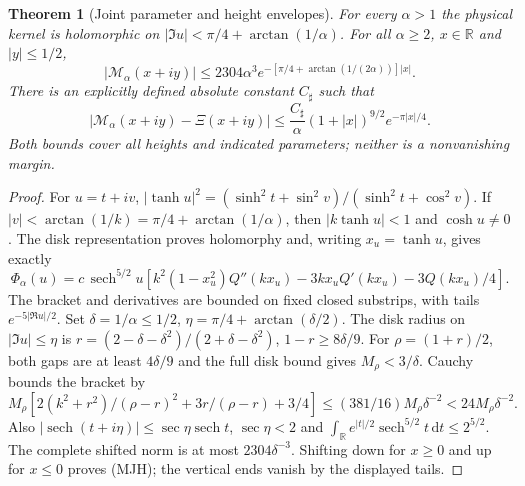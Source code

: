 \documentclass[11pt]{article}
\newtheorem{theorem}{Theorem}
\theoremstyle{remark}\newtheorem{remark}[theorem]{Remark}
\newcommand{\R}{\mathbb R}
\newcommand{\dd}{\,\mathrm d}
\begin{document}
\begin{theorem}[Joint parameter and height envelopes]
\label{thm:mehler-joint-envelope}
For every $\alpha>1$ the physical kernel is holomorphic on
$|\Im u|<\pi/4+\arctan(1/\alpha)$.
For all $\alpha\ge2$, $x\in\R$ and $|y|\le1/2$,
\[
 |\mathcal M_\alpha(x+iy)|
 \le2304\alpha^3e^{-[\pi/4+\arctan(1/(2\alpha))]|x|}. \tag{MJH}
\]
There is an explicitly defined absolute constant $C_\sharp$ such that
\[
 |\mathcal M_\alpha(x+iy)-\Xi(x+iy)|
 \le \frac{C_\sharp}{\alpha}(1+|x|)^{9/2}e^{-\pi|x|/4}. \tag{MJD}
\]
Both bounds cover all heights and indicated parameters; neither
is a nonvanishing margin.
\end{theorem}
\begin{proof}
For $u=t+iv$,
$|\tanh u|^2=(\sinh^2t+\sin^2v)/(\sinh^2t+\cos^2v)$.
If $|v|<\arctan(1/k)=\pi/4+\arctan(1/\alpha)$, then
$|k\tanh u|<1$ and $\cosh u\ne0$. The disk representation proves
holomorphy and, writing $x_u=\tanh u$, gives exactly
\[
 \Phi_\alpha(u)=c\,\operatorname{sech}^{5/2}u
 [k^2(1-x_u^2)Q''(kx_u)-3kx_uQ'(kx_u)-3Q(kx_u)/4].
\]
The bracket and derivatives are bounded on fixed closed substrips,
with tails $e^{-5|\Re u|/2}$.
Set $\delta=1/\alpha\le1/2$, $\eta=\pi/4+\arctan(\delta/2)$.
The disk radius on $|\Im u|\le\eta$ is
$r=(2-\delta-\delta^2)/(2+\delta-\delta^2)$, $1-r\ge8\delta/9$.
For $\rho=(1+r)/2$, both gaps are at least $4\delta/9$ and the
full disk bound gives $M_\rho<3/\delta$. Cauchy bounds the bracket by
\[
 M_\rho[2(k^2+r^2)/(\rho-r)^2+3r/(\rho-r)+3/4]
 \le(381/16)M_\rho\delta^{-2}<24M_\rho\delta^{-2}.
\]
Also $|\operatorname{sech}(t+i\eta)|\le\sec\eta\operatorname{sech}t$,
$\sec\eta<2$ and
$\int_\R e^{|t|/2}\operatorname{sech}^{5/2}t\dd t\le2^{5/2}$.
The complete shifted norm is at most $2304\delta^{-3}$.
Shifting down for $x\ge0$ and up for $x\le0$ proves (MJH);
the vertical ends vanish by the displayed tails.


\end{proof}
\end{document}
